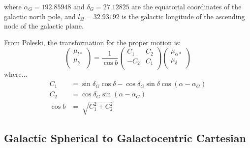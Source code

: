 \documentclass[iop,apj,twocolappendix,numberedappendix]{emulateapj}
\begin{document}
where $\alpha_{G} = 192.85948$ and $\delta_{G} = 27.12825$ are the equatorial coordinates of the galactic north pole, and $l_{\Omega} = 32.93192$ is the galactic longitude of the ascending node of the galactic plane.
\par
From Poleski, the transformation for the proper motion is:
\begin{equation}
\left( \begin{array}{c}
\mu_{l*} \\
\mu_{b} \\
\end{array} \right) = 
\frac{1}{\cos b}
\left( \begin{array}{cc}
C_{1} & C_{2} \\
-C_{2} & C_{1} \\
\end{array} \right)
\left( \begin{array}{c}
\mu_{\alpha*} \\
\mu_{\delta} \\
\end{array} \right)
\end{equation}
where...
\begin{equation}
\begin{aligned}
C_{1}&=\sin\delta_{G}\cos\delta - \cos\delta_{G}\sin\delta\cos(\alpha-\alpha_{G})\\
C_{2}&=\cos\delta_{G}\sin(\alpha-\alpha_{G})\\
\cos b&=\sqrt[]{C_{1}^2+C_{2}^2}
\end{aligned}
\end{equation}


\subsection{Galactic Spherical to Galactocentric Cartesian}
\label{sec:sphere_to_cart}
\end{document}
